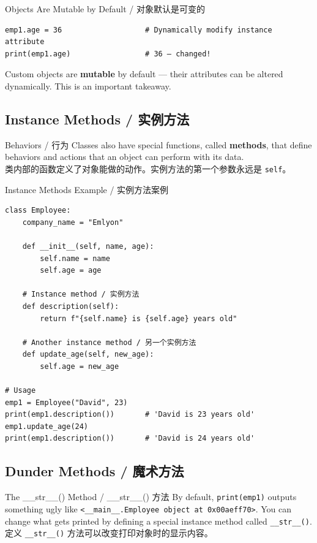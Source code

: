 \documentclass[11pt,a4paper]{report}
\let\oldtexttt\texttt
\renewcommand{\texttt}[1]{\textcolor{mainblue}{\oldtexttt{#1}}}
\begin{document}
\begin{warning}{Objects Are Mutable by Default / 对象默认是可变的}
    \begin{lstlisting}
emp1.age = 36                   # Dynamically modify instance attribute
print(emp1.age)                 # 36 — changed!
    \end{lstlisting}
    Custom objects are \textbf{mutable} by default — their attributes can be altered dynamically. This is an important takeaway.
\end{warning}

\subsection{Instance Methods / 实例方法}

\begin{concept}{Behaviors / 行为}
    Classes also have special functions, called \textbf{methods}, that define behaviors and actions that an object can perform with its data. \\
    类内部的函数定义了对象能做的动作。实例方法的第一个参数永远是 \texttt{self}。
\end{concept}

\begin{examplebox}{Instance Methods Example / 实例方法案例}
\begin{lstlisting}
class Employee:
    company_name = "Emlyon"

    def __init__(self, name, age):
        self.name = name
        self.age = age

    # Instance method / 实例方法
    def description(self):
        return f"{self.name} is {self.age} years old"

    # Another instance method / 另一个实例方法
    def update_age(self, new_age):
        self.age = new_age

# Usage
emp1 = Employee("David", 23)
print(emp1.description())       # 'David is 23 years old'
emp1.update_age(24)
print(emp1.description())       # 'David is 24 years old'
\end{lstlisting}
\end{examplebox}

\subsection{Dunder Methods / 魔术方法}

\begin{concept}{The \_\_str\_\_() Method / \_\_str\_\_() 方法}
    By default, \texttt{print(emp1)} outputs something ugly like \texttt{<\_\_main\_\_.Employee object at 0x00aeff70>}. You can change what gets printed by defining a special instance method called \texttt{\_\_str\_\_()}. \\
    定义 \texttt{\_\_str\_\_()} 方法可以改变打印对象时的显示内容。
\end{concept}
\end{document}
